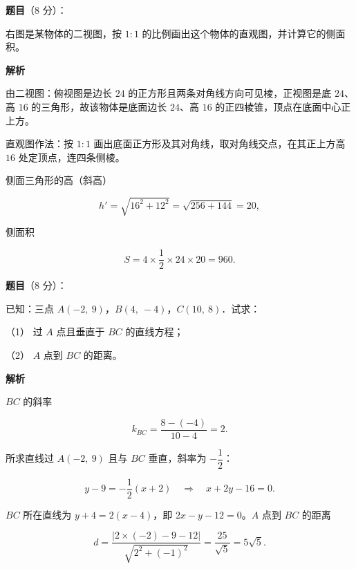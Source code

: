 \begin{answer}

\textbf{题目}（8 分）：

右图是某物体的二视图，按 $1:1$ 的比例画出这个物体的直观图，并计算它的侧面积。
\nopagebreak[4]
\begin{center}\end{center}
\nopagebreak[4]
\textbf{解析}
\nopagebreak[4]
\begin{center}\end{center}
\nopagebreak[4]
由二视图：俯视图是边长 $24$ 的正方形且两条对角线方向可见棱，正视图是底 $24$、高 $16$ 的三角形，故该物体是底面边长 $24$、高 $16$ 的正四棱锥，顶点在底面中心正上方。

直观图作法：按 $1:1$ 画出底面正方形及其对角线，取对角线交点，在其正上方高 $16$ 处定顶点，连四条侧棱。

侧面三角形的高（斜高）

\nopagebreak[4]
\[
h'=\sqrt{16^2+12^2}=\sqrt{256+144}=20,
\]

侧面积

\nopagebreak[4]
\[
S=4\times\frac{1}{2}\times24\times20=960.
\]


\end{answer}
\begin{answer}

\textbf{题目}（8 分）：

已知：三点 $A(-2,\ 9)$，$B(4,\ -4)$，$C(10,\ 8)$．试求：

（1） 过 $A$ 点且垂直于 $BC$ 的直线方程；

（2） $A$ 点到 $BC$ 的距离。

\textbf{解析}


$BC$ 的斜率

\nopagebreak[4]
\[
k_{BC}=\frac{8-(-4)}{10-4}=2.
\]

所求直线过 $A(-2,\ 9)$ 且与 $BC$ 垂直，斜率为 $-\dfrac{1}{2}$：

\nopagebreak[4]
\[
y-9=-\frac{1}{2}(x+2)
\quad\Longrightarrow\quad
x+2y-16=0.
\]


$BC$ 所在直线为 $y+4=2(x-4)$，即 $2x-y-12=0$。$A$ 点到 $BC$ 的距离

\nopagebreak[4]
\[
d=\frac{|2\times(-2)-9-12|}{\sqrt{2^2+(-1)^2}}=\frac{25}{\sqrt{5}}=5\sqrt{5}.
\]



\end{answer}
